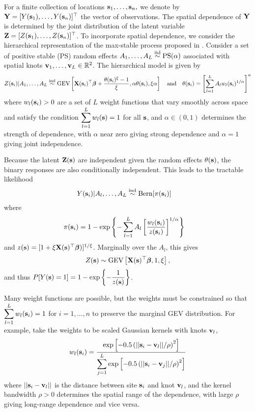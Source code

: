 For a finite collection of locations $\mathbf{s}_1, \ldots, \mathbf{s}_n,$ we denote by $\mathbf{Y} = [Y(\mathbf{s}_1), \ldots, Y(\mathbf{s}_n)]^\top$ the vector of observations.
The spatial dependence of $\mathbf{Y}$ is determined by the joint distribution of the latent variable $\mathbf{Z} = [Z(\mathbf{s}_1),\ldots, Z(\mathbf{s}_n)]^\top$.
To incorporate spatial dependence, we consider the hierarchical representation of the max-stable process proposed in \citet{Reich2012}.
Consider a set of positive stable (PS) random effects $A_1, \ldots, A_L \stackrel{\mathrm{iid}}{\sim} \text{PS}(\alpha)$ associated with spatial knots $\mathbf{v}_1, \ldots, \mathbf{v}_L \in \mathbb{R}^2$.
The hierarchical model is given by
\begin{align} \label{rbeq:hiermodel}
Z(\mathbf{s}_i) | A_1, \ldots, A_L \stackrel{\mathrm{ind}}{\sim} \text{GEV}\left[\mathbf{X}(\mathbf{s}_i)^\top \mbox{\boldmath $\beta$} + \frac{\theta(\mathbf{s}_i)^\xi - 1}{\xi}, \alpha \theta(\mathbf{s}_i), \xi \alpha\right] \quad \text{and} \quad \theta(\mathbf{s}_i) = \left[\sum_{l = 1}^L A_l w_l (\mathbf{s}_i)^{1 / \alpha} \right]^\alpha
\end{align}
where $w_{l}(\mathbf{s}_i) > 0$ are a set of $L$ weight functions that vary smoothly across space and satisfy the condition \mbox{$\displaystyle \sum_{l = 1}^L w_l(\mathbf{s}) = 1$} for all $\mathbf{s}$, and $\alpha\in(0,1)$ determines the strength of dependence, with $\alpha$ near zero giving strong dependence and $\alpha=1$ giving joint independence.

Because the latent $\mathbf{Z}(\mathbf{s})$ are independent given the random effects $\theta(\mathbf{s})$, the binary responses are also conditionally independent.
This leads to the tractable likelihood
\begin{align} \label{rbeq:condlike}
Y(\mathbf{s}_i) | A_l, \ldots, A_L &\stackrel{\mathrm{ind}}{\sim} \text{Bern}[\pi(\mathbf{s}_i)]
\end{align}
where
\begin{align} \label{rbeq:pyeq1cond}
\pi(\mathbf{s}_i) &= 1 - \exp \left\{ -\displaystyle \sum_{ l = 1 }^{L} A_l \left[ \frac{ w_{l}(\mathbf{s}_i) }{ z(\mathbf{s}_i) } \right]^{ 1/\alpha} \right\}
\end{align}
and $z(\mathbf{s}) = [1 + \xi \mathbf{X}(\mathbf{s})^\top \mbox{\boldmath $\beta$})]^{1 / \xi}$.
Marginally over the $A_l$, this gives
\begin{align}
Z(\mathbf{s}) \sim \text{GEV}\left[\mathbf{X}(\mathbf{s})^\top \mbox{\boldmath $\beta$}, 1, \xi\right],
\end{align}
and thus $P[Y(\mathbf{s}) = 1] = 1 - \exp\left\{-\displaystyle \frac{1}{z(\mathbf{s})}\right\}$.

Many weight functions are possible, but the weights must be constrained so that $\displaystyle \sum_{l=1}^L w_{l}(\mathbf{s}_i)=1$ for $i=1,\ldots,n$ to preserve the marginal GEV distribution.
For example, \cite{Reich2012} take the weights to be scaled Gaussian kernels with knots $\mathbf{v}_l$,
\begin{align}\label{rbeq:w}
w_{l}(\mathbf{s}_i) = \frac{\exp\left[-0.5\left(||\mathbf{s}_i-\mathbf{v}_l||/\rho\right)^2\right]}
{\displaystyle \sum_{j=1}^L\exp\left[-0.5\left(||\mathbf{s}_i-\mathbf{v}_j||/\rho\right)^2\right]}
\end{align}
where $||\mathbf{s}_i - \mathbf{v}_l||$ is the distance between site $\mathbf{s}_i$ and knot $\mathbf{v}_l$, and the kernel bandwidth $\rho>0$ determines the spatial range of the dependence, with large $\rho$ giving long-range dependence and vice versa.

